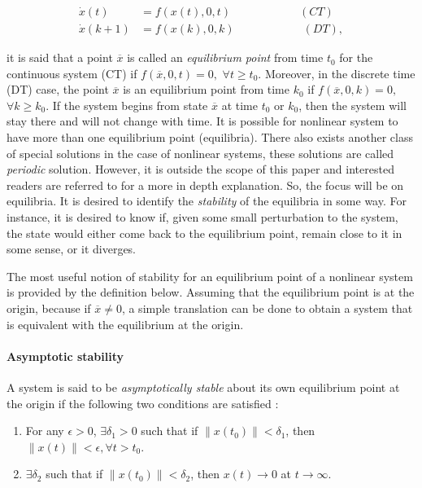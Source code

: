 \documentclass{thesisreport}
\begin{document}
\begin{align}
 \dot{x}(t) &= f(x(t),0,t) \hspace{1in} (CT) \\
 \dot{x}(k+1) &= f(x(k),0,k) \hspace{1in} (DT),
\end{align}

 it is said that a point $\overline{x}$ is called an \textit{equilibrium point} from time $t_0$ for the continuous system (CT) if $f(\overline{x},0,t)=0,$ $\forall t \geq t_0$. Moreover, in the discrete time (DT) case, the point $\overline{x}$ is an equilibrium point from time $k_0$ if $f(\overline{x},0,k)=0,$ $\forall k \geq k_0$.
If the system begins from state $\overline{x}$ at time $t_0$ or $k_0$, then the system will stay there and will not change with time. It is possible for nonlinear system to have more than one equilibrium point (equilibria). There also exists another class of special solutions in the case of nonlinear systems, these solutions are called \textit{periodic} solution. However, it is outside the scope of this paper and interested readers are referred to \cite{Schmitt1972} for a more in depth explanation. So, the focus will be on equilibria. It is desired to identify the \textit{stability} of the equilibria in some way. For instance, it is desired to know if, given some small perturbation to the system, the state would either come back to the equilibrium point, remain close to it in some sense, or it diverges.

The most useful notion of stability for an equilibrium point of a nonlinear system is provided by the definition below. Assuming that the equilibrium point is at the origin, because if $\overline{x} \neq 0$, a simple translation can be done to obtain a system that is equivalent with the equilibrium at the origin.

\paragraph{Asymptotic stability} A system is said to be \textit{asymptotically stable} about its own equilibrium point at the origin if the following two conditions are satisfied \cite{Dahleh2011}:

\begin{enumerate}
	\item For any $\epsilon > 0$, $\exists \delta_1 > 0$ such that if $\| x(t_0)\|<\delta_1$, then $\|x(t)\|<\epsilon, \forall t>t_0$.
	\item $\exists \delta_2$ such that if $\|x(t_0)\|<\delta_2$, then $x(t)\rightarrow 0$ at $t \rightarrow \infty$.
\end{enumerate}
\end{document}
